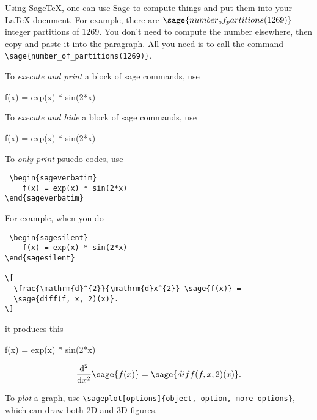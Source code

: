 \documentclass{amsart}
\begin{document}
Using Sage\TeX, one can use Sage to compute things and put them into
your \LaTeX{} document. For example, there are
$\sage{number_of_partitions(1269)}$ integer partitions of $1269$.
You don't need to compute the number elsewhere, then copy and paste
it into the paragraph. All you need is to call the command {\color{red}\verb|\sage{number_of_partitions(1269)}|}.
  
  
 To {\em execute and print} a block of sage commands, use
 {\color{red}
 \begin{sageverbatim}
 \begin{sageblock}
    f(x) = exp(x) * sin(2*x)
\end{sageblock}
 \end{sageverbatim}
}

To {\em execute and hide} a block of sage commands, use 
 {\color{red}
 \begin{sageverbatim}
 \begin{sagesilent}
    f(x) = exp(x) * sin(2*x)
\end{sagesilent}
 \end{sageverbatim}
}

To {\em only print} psuedo-codes, use
{\color{red}
 \begin{verbatim}
 \begin{sageverbatim}
    f(x) = exp(x) * sin(2*x)
\end{sageverbatim}
 \end{verbatim}
}

\begin{framed}
For example, when you do 
 
 {\color{red}
 \begin{verbatim}
 \begin{sagesilent}
    f(x) = exp(x) * sin(2*x)
\end{sagesilent}

\[
  \frac{\mathrm{d}^{2}}{\mathrm{d}x^{2}} \sage{f(x)} =
  \sage{diff(f, x, 2)(x)}.
\]
\end{verbatim}
}

it produces this
 \begin{sagesilent}
    f(x) = exp(x) * sin(2*x)
\end{sagesilent}
\[
  \frac{\mathrm{d}^{2}}{\mathrm{d}x^{2}} \sage{f(x)} =
  \sage{diff(f, x, 2)(x)}.
\]

\end{framed}
To {\em plot} a graph, use {\color{red}\verb|\sageplot[options]{object, option, more options}|}, which can draw both 2D and 3D figures. 
\end{document}

